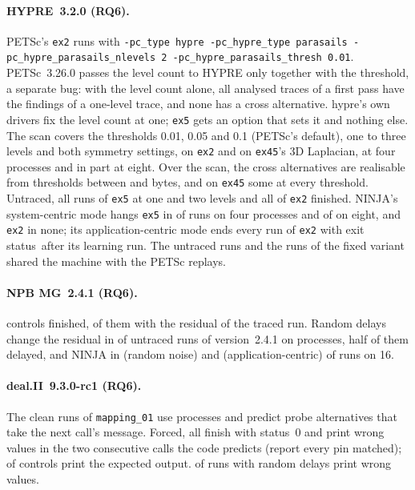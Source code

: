 \paragraph{HYPRE~3.2.0 (RQ6).} PETSc's \texttt{ex2} runs with \texttt{-pc\_type hypre
-pc\_hypre\_type parasails -pc\_hypre\_parasails\_nlevels 2 -pc\_hypre\_parasails\_thresh 0.01}.
PETSc~3.26.0 passes the level count to HYPRE only together with the threshold, a separate bug:
with the level count alone, all \nPetscNoThreshSameAsOne analysed traces of a first pass have
the findings of a one-level trace, and none has a cross alternative. hypre's own drivers fix the
level count at one; \texttt{ex5} gets an option that sets it and nothing else. The scan covers
the thresholds 0.01, 0.05 and 0.1 (PETSc's default), one to three levels and both symmetry
settings, on \texttt{ex2} and on \texttt{ex45}'s 3D Laplacian, at four processes and in part at
eight. Over the scan, the cross alternatives are realisable from thresholds between
\BPetscScanMin and \BPetscScanMax bytes, and on \texttt{ex45} some at every threshold. Untraced, all
\nHypreNewStressRuns runs of \texttt{ex5} at one and two levels and all \nPetscStressRuns of
\texttt{ex2} finished. NINJA's system-centric mode hangs \texttt{ex5} in
\nNinjaHypreNewFourSystemHang of \nNinjaHypreNewFourSystemRuns runs on four processes and
\nNinjaHypreNewEightSystemHang of \nNinjaHypreNewEightSystemRuns on eight, and \texttt{ex2} in none; its application-centric mode ends every run of \texttt{ex2} with exit
status~\NinjaPetscAppStatus after its learning run. The untraced runs and the runs of the fixed
variant shared the machine with the PETSc replays.

\paragraph{NPB MG~2.4.1 (RQ6).} \nMGControls controls finished, \nMGControlsSame of them with the
residual of the traced run. Random delays change the residual in \nMGStressChanged of
\nMGStressRuns untraced runs of version~2.4.1 on \nMGStressRanks processes, half of them
delayed, and NINJA in \nNinjaMGSixteenRandomChanged (random noise) and
\nNinjaMGSixteenAppChanged (application-centric) of \nNinjaMGSixteenRandomRuns runs on 16.

\paragraph{deal.II~9.3.0-rc1 (RQ6).} The \nDealTraced clean runs of \texttt{mapping\_01} use
\nDealRanks processes and predict \nDealAlts probe alternatives that take the next call's
message. Forced, all \nDealReplayed finish with status~0 and print wrong values in the two
consecutive calls the code predicts (\nDealMatched report every pin matched); \nDealControlsSame
of \nDealControls controls print the expected output. \nDealStressDelayChanged of
\nDealStressDelayRuns runs with random delays print wrong values.

